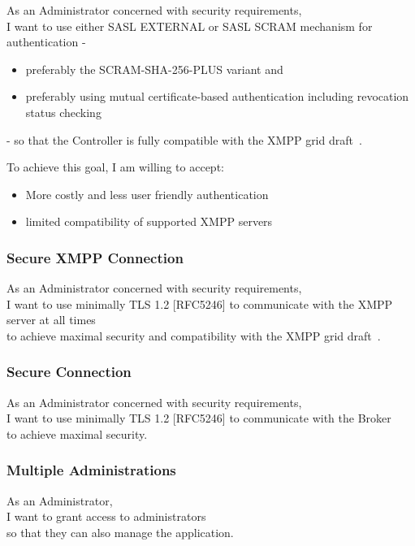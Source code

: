 As an Administrator concerned with security requirements,\\
I want to use either SASL EXTERNAL or SASL SCRAM mechanism for authentication -

\begin{itemize}
    \item preferably the SCRAM-SHA-256-PLUS variant and
    \item preferably using mutual certificate-based authentication including revocation status checking
\end{itemize}

\noindent - so that the Controller is fully compatible with the XMPP grid draft~\cite{ietf-mile-xmpp-grid-05}.

\noindent To achieve this goal, I am willing to accept:
\begin{itemize}
    \item More costly and less user friendly authentication
    \item limited compatibility of supported XMPP servers
\end{itemize}

\subsubsection{Secure XMPP Connection}

As an Administrator concerned with security requirements,\\
I want to use minimally TLS 1.2 [RFC5246] to communicate with the XMPP server at all times\\
to achieve maximal security and compatibility with the XMPP grid draft~\cite{ietf-mile-xmpp-grid-05}.

\subsubsection{Secure Connection}

As an Administrator concerned with security requirements,\\
I want to use minimally TLS 1.2 [RFC5246] to communicate with the Broker\\
to achieve maximal security.

\subsubsection{Multiple Administrations}

As an Administrator,\\
I want to grant access to administrators \\
so that they can also manage the application.

